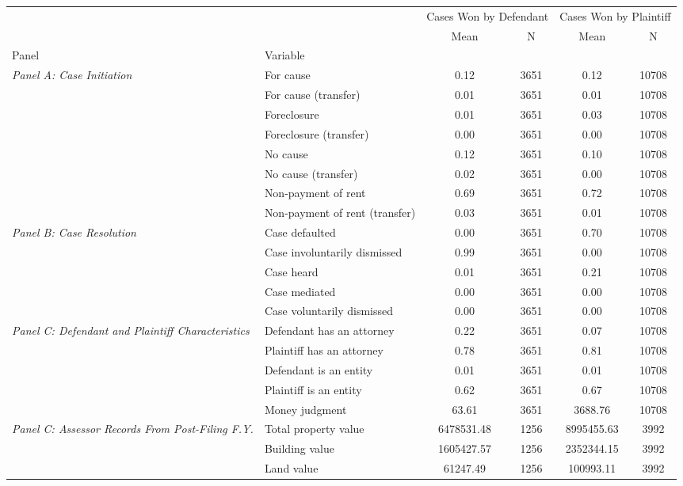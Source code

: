 \begin{tabular}{llcccc}
\toprule
 &  & \multicolumn{2}{|c|}{Cases Won by Defendant} & \multicolumn{2}{|c|}{Cases Won by Plaintiff} \\
 &  & Mean & N & Mean & N \\
Panel & Variable &  &  &  &  \\
\midrule
\multirow[c]{8}{4cm}{\textit{Panel A: Case Initiation}} & For cause & 0.12 & 3651 & 0.12 & 10708 \\
 & For cause (transfer) & 0.01 & 3651 & 0.01 & 10708 \\
 & Foreclosure & 0.01 & 3651 & 0.03 & 10708 \\
 & Foreclosure (transfer) & 0.00 & 3651 & 0.00 & 10708 \\
 & No cause & 0.12 & 3651 & 0.10 & 10708 \\
 & No cause (transfer) & 0.02 & 3651 & 0.00 & 10708 \\
 & Non-payment of rent & 0.69 & 3651 & 0.72 & 10708 \\
 & Non-payment of rent (transfer) & 0.03 & 3651 & 0.01 & 10708 \\
\cline{1-6}
\multirow[c]{5}{4cm}{\textit{Panel B: Case Resolution}} & Case defaulted & 0.00 & 3651 & 0.70 & 10708 \\
 & Case involuntarily dismissed & 0.99 & 3651 & 0.00 & 10708 \\
 & Case heard & 0.01 & 3651 & 0.21 & 10708 \\
 & Case mediated & 0.00 & 3651 & 0.00 & 10708 \\
 & Case voluntarily dismissed & 0.00 & 3651 & 0.00 & 10708 \\
\cline{1-6}
\multirow[c]{5}{4cm}{\textit{Panel C: Defendant and Plaintiff Characteristics}} & Defendant has an attorney & 0.22 & 3651 & 0.07 & 10708 \\
 & Plaintiff has an attorney & 0.78 & 3651 & 0.81 & 10708 \\
 & Defendant is an entity & 0.01 & 3651 & 0.01 & 10708 \\
 & Plaintiff is an entity & 0.62 & 3651 & 0.67 & 10708 \\
 & Money judgment & 63.61 & 3651 & 3688.76 & 10708 \\
\cline{1-6}
\multirow[c]{5}{4cm}{\textit{Panel C: Assessor Records From Post-Filing F.Y.}} & Total property value & 6478531.48 & 1256 & 8995455.63 & 3992 \\
 & Building value & 1605427.57 & 1256 & 2352344.15 & 3992 \\
 & Land value & 61247.49 & 1256 & 100993.11 & 3992 \\

\end{tabular}
